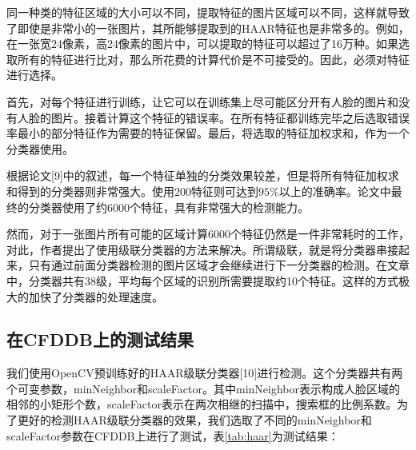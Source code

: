 同一种类的特征区域的大小可以不同，提取特征的图片区域可以不同，这样就导致了即使是非常小的一张图片，其所能够提取到的HAAR特征也是非常多的。例如，在一张宽24像素，高24像素的图片中，可以提取的特征可以超过了16万种。如果选取所有的特征进行比对，那么所花费的计算代价是不可接受的。因此，必须对特征进行选择。

首先，对每个特征进行训练，让它可以在训练集上尽可能区分开有人脸的图片和没有人脸的图片。接着计算这个特征的错误率。在所有特征都训练完毕之后选取错误率最小的部分特征作为需要的特征保留。最后，将选取的特征加权求和，作为一个分类器使用。

根据论文[9]中的叙述，每一个特征单独的分类效果较差，但是将所有特征加权求和得到的分类器则非常强大。使用200特征则可达到$95\%$以上的准确率。论文中最终的分类器使用了约6000个特征，具有非常强大的检测能力。

然而，对于一张图片所有可能的区域计算6000个特征仍然是一件非常耗时的工作，对此，作者提出了使用级联分类器的方法来解决。所谓级联，就是将分类器串接起来，只有通过前面分类器检测的图片区域才会继续进行下一分类器的检测。在文章中，分类器共有38级，平均每个区域的识别所需要提取约10个特征。这样的方式极大的加快了分类器的处理速度。

\subsection{在CFDDB上的测试结果}

我们使用OpenCV预训练好的HAAR级联分类器[10]进行检测。这个分类器共有两个可变参数，minNeighbor和scaleFactor。其中minNeighbor表示构成人脸区域的相邻的小矩形个数，scaleFactor表示在两次相继的扫描中，搜索框的比例系数。为了更好的检测HAAR级联分类器的效果，我们选取了不同的minNeighbor和scaleFactor参数在CFDDB上进行了测试，表\ref{tab:haar}为测试结果：

